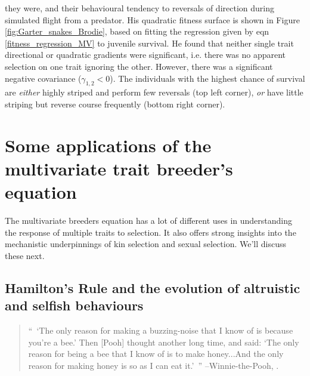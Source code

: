 they were, and their behavioural tendency to reversals of direction
during simulated flight from a predator. His quadratic fitness surface is shown in Figure
\ref{fig:Garter_snakes_Brodie}, based on fitting the
regression given by eqn \eqref{fitness_regression_MV} to juvenile
survival. He found that neither single trait directional or quadratic
gradients were significant, i.e. there was no apparent selection on one 
trait ignoring the other. However, there was a significant negative
covariance ($\gamma_{1,2}<0$). The individuals with the highest chance of survival are
{\it either} highly striped and perform few reversals (top left
corner), {\it or} have little striping but reverse course frequently
(bottom right corner). 



\section{Some applications of the multivariate trait breeder's equation}

The multivariate breeders equation has a lot of different uses in
understanding the response of multiple traits to selection. It also
offers strong insights into the mechanistic underpinnings of kin selection and sexual selection. We'll discuss these next.

\subsection{Hamilton's Rule and the evolution of altruistic and
  selfish behaviours}
\begin{quotation}
``~`The only reason for making a buzzing-noise that I know of is
because you're a bee.' Then [Pooh] thought another long time, and
said: `The only reason for being a bee that I know of is to make
honey...And the only reason for making honey is so as I can eat it.'~''
--Winnie-the-Pooh, \citet{milne}.  
\end{quotation}



